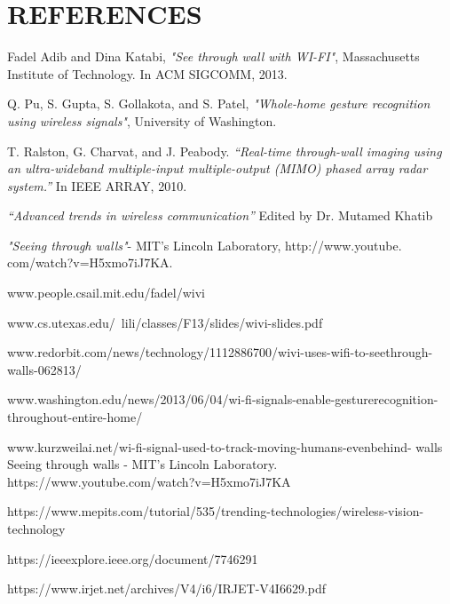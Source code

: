 \documentclass[a4paper,12pt,oneside]{article}
\begin{document}
\section{REFERENCES}
\vspace{5mm}
\begin{thebibliography}{10}


 Fadel Adib and Dina Katabi, \emph{"See through wall with WI-FI"}, Massachusetts
Institute of Technology. In ACM SIGCOMM, 2013.

  Q. Pu, S. Gupta, S. Gollakota, and S. Patel, \emph{"Whole-home gesture
recognition using wireless signals"}, University of Washington.

  T. Ralston, G. Charvat, and J. Peabody. \emph{“Real-time through-wall imaging
using an ultra-wideband multiple-input multiple-output (MIMO) phased
array radar system.”} In IEEE ARRAY, 2010.

 \emph{“Advanced trends in wireless communication”} Edited by Dr. Mutamed
Khatib

  \emph{"Seeing through walls"}- MIT's Lincoln Laboratory, http://www.youtube.
com/watch?v=H5xmo7iJ7KA.

  www.people.csail.mit.edu/fadel/wivi

 www.cs.utexas.edu/~lili/classes/F13/slides/wivi-slides.pdf

 www.redorbit.com/news/technology/1112886700/wivi-uses-wifi-to-seethrough-
walls-062813/

 www.washington.edu/news/2013/06/04/wi-fi-signals-enable-gesturerecognition-
throughout-entire-home/

 www.kurzweilai.net/wi-fi-signal-used-to-track-moving-humans-evenbehind-
walls
 Seeing through walls - MIT’s Lincoln Laboratory. https://www.youtube.com/watch?v=H5xmo7iJ7KA

 https://www.mepits.com/tutorial/535/trending-technologies/wireless-vision-technology

 https://ieeexplore.ieee.org/document/7746291

 https://www.irjet.net/archives/V4/i6/IRJET-V4I6629.pdf


\end{thebibliography}
\end{document}
